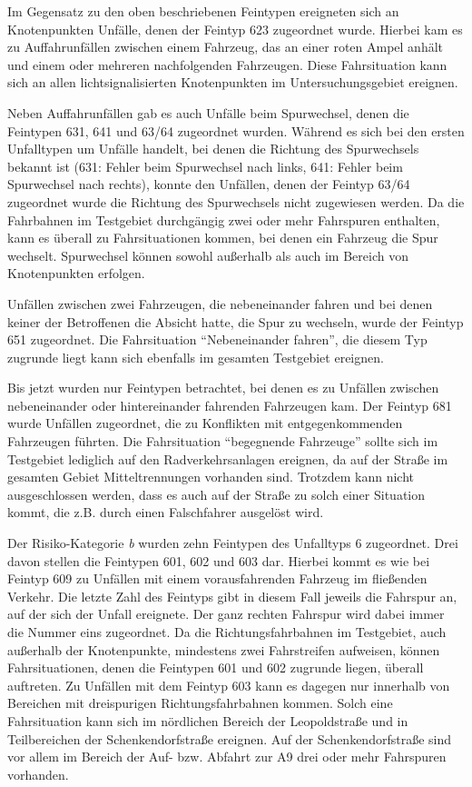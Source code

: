 Im Gegensatz zu den oben beschriebenen Feintypen ereigneten sich an Knotenpunkten Unfälle, denen der Feintyp 623 zugeordnet wurde. Hierbei kam es zu Auffahrunfällen zwischen einem Fahrzeug, das an einer roten Ampel anhält und einem oder mehreren nachfolgenden Fahrzeugen. Diese Fahrsituation kann sich an allen lichtsignalisierten Knotenpunkten im Untersuchungsgebiet ereignen.

Neben Auffahrunfällen gab es auch Unfälle beim Spurwechsel, denen die Feintypen 631, 641 und 63/64 zugeordnet wurden. Während es sich bei den ersten Unfalltypen um Unfälle handelt, bei denen die Richtung des Spurwechsels bekannt ist (631: Fehler beim Spurwechsel nach links, 641: Fehler beim Spurwechsel nach rechts), konnte den Unfällen, denen der Feintyp 63/64 zugeordnet wurde die Richtung des Spurwechsels nicht zugewiesen werden. Da die Fahrbahnen im Testgebiet durchgängig zwei oder mehr Fahrspuren enthalten, kann es überall zu Fahrsituationen kommen, bei denen ein Fahrzeug die Spur wechselt. Spurwechsel können sowohl außerhalb als auch im Bereich von Knotenpunkten erfolgen.

Unfällen zwischen zwei Fahrzeugen, die nebeneinander fahren und bei denen keiner der Betroffenen die Absicht hatte, die Spur zu wechseln, wurde der Feintyp 651 zugeordnet. Die Fahrsituation \enquote{Nebeneinander fahren}, die diesem Typ zugrunde liegt kann sich ebenfalls im gesamten Testgebiet ereignen.

Bis jetzt wurden nur Feintypen betrachtet, bei denen es zu Unfällen zwischen nebeneinander oder hintereinander fahrenden Fahrzeugen kam. Der Feintyp 681 wurde Unfällen zugeordnet, die zu Konflikten mit entgegenkommenden Fahrzeugen führten. Die Fahrsituation \enquote{begegnende Fahrzeuge} sollte sich im Testgebiet lediglich auf den Radverkehrsanlagen ereignen, da auf der Straße im gesamten Gebiet Mitteltrennungen vorhanden sind. Trotzdem kann nicht ausgeschlossen werden, dass es auch auf der Straße zu solch einer Situation kommt, die z.B. durch einen Falschfahrer ausgelöst wird.

Der Risiko-Kategorie \textit{b} wurden zehn Feintypen des Unfalltyps 6 zugeordnet. Drei davon stellen die Feintypen 601, 602 und 603 dar. Hierbei kommt es wie bei Feintyp 609 zu Unfällen mit einem vorausfahrenden Fahrzeug im fließenden Verkehr. Die letzte Zahl des Feintyps gibt in diesem Fall jeweils die Fahrspur an, auf der sich der Unfall ereignete. Der ganz rechten Fahrspur wird dabei immer die Nummer eins zugeordnet. Da die Richtungsfahrbahnen im Testgebiet, auch außerhalb der Knotenpunkte, mindestens zwei Fahrstreifen aufweisen, können Fahrsituationen, denen die Feintypen 601 und 602 zugrunde liegen, überall auftreten. Zu Unfällen mit dem Feintyp 603 kann es dagegen nur innerhalb von Bereichen mit dreispurigen Richtungsfahrbahnen kommen. Solch eine Fahrsituation kann sich im nördlichen Bereich der Leopoldstraße und in Teilbereichen der Schenkendorfstraße ereignen. Auf der Schenkendorfstraße sind vor allem im Bereich der Auf- bzw. Abfahrt zur A9 drei oder mehr Fahrspuren vorhanden.

